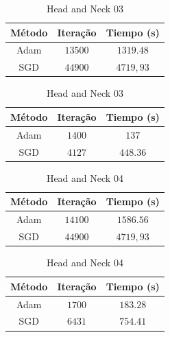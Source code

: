 \documentclass[a4paper,12pt]{article}
\begin{document}
\vspace{-0.5cm}
\begin{table}[!ht]
    \centering
    \caption{Head and Neck 03}
    \begin{minipage}[t]{0.45\textwidth}
        \centering
        \label{tab:tab1}
        \begin{tabular}{ccc}
            \hline
            Método & Iteração & Tiempo (s)\\
            \hline
            Adam & $13500$ &  $1319.48$ \\
            SGD & $44900$ & $4719,93$ \\
            \hline
        \end{tabular}
    \end{minipage}
    \hfill
    \begin{minipage}[t]{0.45\textwidth}
        \centering
        \label{tab:tab2}
        \begin{tabular}{ccc}
            \hline
            Método & Iteração & Tiempo (s) \\
            \hline
            Adam & $1400$ &   $137$  \\
            SGD & $4127$ & $448.36$ \\
            \hline
        \end{tabular}
    \end{minipage}
\end{table}

\vspace{-0.5cm}
\begin{table}[!ht]
    \centering
    \caption{Head and Neck 04}
    \begin{minipage}[t]{0.45\textwidth}
        \centering
        \label{tab:tab1}
        \begin{tabular}{ccc}
            \hline
            Método & Iteração & Tiempo (s)\\
            \hline
            Adam & $14100$ &  $1586.56$ \\
            SGD & $44900$ & $4719,93$ \\
            \hline
        \end{tabular}
    \end{minipage}
    \hfill
    \begin{minipage}[t]{0.45\textwidth}
        \centering
        \label{tab:tab2}
        \begin{tabular}{ccc}
            \hline
            Método & Iteração & Tiempo (s) \\
            \hline
            Adam & $1700$ &   $183.28$  \\
            SGD & $6431$ & $754.41$ \\
            \hline
        \end{tabular}
    \end{minipage}
\end{table}
\end{document}
